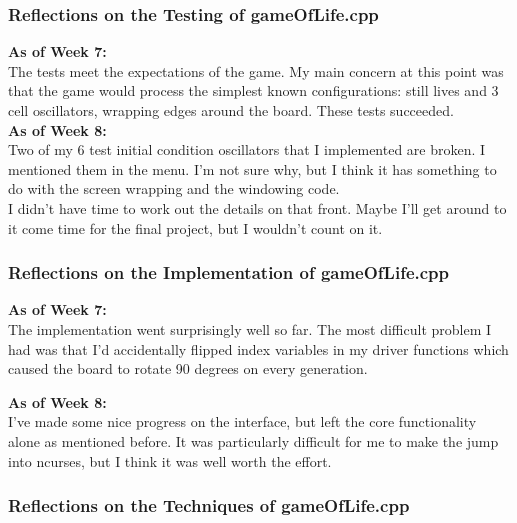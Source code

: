 \documentclass[11pt, oneside]{memoir}
\begin{document}
\subsubsection{Reflections on the Testing of gameOfLife.cpp}

\textbf{As of Week 7:}\\

The tests meet the expectations of the game. My main concern at this
point was that the game would process the simplest known
configurations:  still lives and 3 cell oscillators, wrapping edges
around the board.  These tests succeeded.  \\

\textbf{As of Week 8:} \\

Two of my 6 test initial condition oscillators that I implemented are
broken. I mentioned them in the menu.   I'm not sure why, but I think
it has something to do with the screen wrapping and the windowing
code.  \\ 

I didn't have time to work out the details on that front. Maybe I'll
get around to it come time for the final project, but I wouldn't count
on it.  



\subsubsection{Reflections on the Implementation of gameOfLife.cpp}

\textbf{As of Week 7:}\\
The implementation went surprisingly well so far.  The most difficult
problem I had was that I'd accidentally flipped index variables in my
driver functions which caused the board to rotate 90 degrees on every
generation.  

\textbf{As of Week 8:}\\
I've made some nice progress on the interface, but left the core
functionality alone as mentioned before.  It was particularly
difficult for me to make the jump into ncurses, but I think it was
well worth the effort. 


\subsubsection{Reflections on the Techniques of gameOfLife.cpp}
\end{document}
